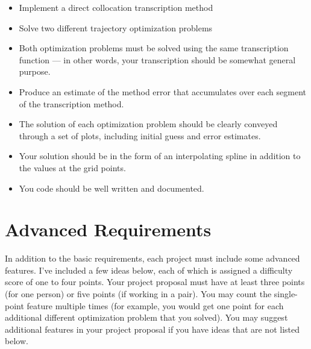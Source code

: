 \vspace{-0.0em} \begin{itemize}  \setlength\itemsep{0em} \setlength\itemindent{18pt}

  \item Implement a direct collocation transcription method

  \item Solve two different trajectory optimization problems

  \item Both optimization problems must be solved using the same transcription function ---
        in other words, your transcription should be somewhat general purpose.

  \item Produce an estimate of the method error that accumulates over each segment
        of the transcription method.

  \item The solution of each optimization problem should be clearly conveyed
        through a set of plots, including initial guess and error estimates.

  \item Your solution should be in the form of an interpolating spline in
        addition to the values at the grid points.

  \item You code should be well written and documented.

\end{itemize}



\pagebreak
\section*{Advanced Requirements}

In addition to the basic requirements, each project must include some advanced
features. I've included a few ideas below, each of which is assigned a
difficulty score of one to four points. Your project proposal must have at
least three points (for one person) or five points (if working in a pair).
You may count the single-point feature multiple times
(for example, you would get one point for
each additional different optimization problem that you solved).
You may suggest additional features in your project proposal if you have ideas
that are not listed below.

